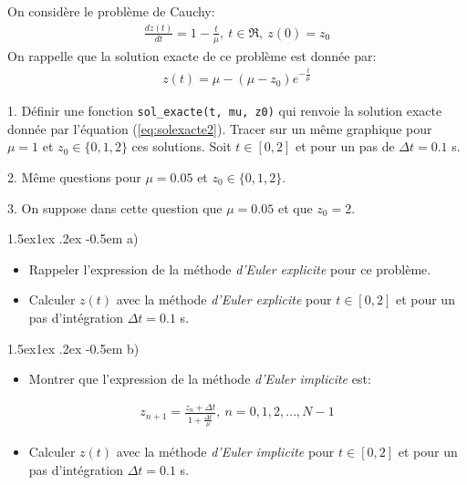 \documentclass[%
oneside,                 %
final,                   %
10pt,french]{article}
\makeatletter
\newenvironment{doconceexercise}{}{}
\newcounter{doconceexercisecounter}
\newcommand\subex{\@startsection{paragraph}{4}{\z@}%
                  {1.5ex\@plus1ex \@minus.2ex}%
                  {-0.5em}%
                  {\normalfont\normalsize\bfseries}}
\makeatother
\begin{document}
\begin{doconceexercise}



On considère le problème de Cauchy:
\begin{align}
\frac{d z(t)}{dt} = 1 - \frac{t}{\mu}, \ t \in \Re, \ z(0) = z_0
\end{align}
On rappelle que la solution exacte de ce problème est donnée par:
\begin{align}
\label{eq:solexacte2}
z(t) = \mu -(\mu - z_0) e^{-\frac{t}{\mu}}
\end{align}

1. Définir une fonction \Verb!sol_exacte(t, mu, z0)! qui renvoie la solution exacte donnée par l'équation (\ref{eq:solexacte2}). Tracer sur un même graphique pour $\mu= 1$ et $z_0 \in \{0, 1, 2\}$ ces solutions. Soit $t \in [0,2]$ et pour un pas de $\Delta t = 0.1$ s.

2. Même questions pour $\mu= 0.05$ et $z_0 \in \{0, 1, 2\}$.

3. On suppose dans cette question que $\mu= 0.05$ et que $z_0  = 2$.


\subex{a)}
\begin{itemize}
\item Rappeler l'expression de la méthode \emph{d'Euler explicite} pour ce problème.

\item Calculer $z(t)$ avec la méthode \emph{d’Euler explicite} pour $t \in [0, 2]$ et pour un pas d’intégration $\Delta t = 0.1$ s.
\end{itemize}

\noindent
\subex{b)}
\begin{itemize}
\item Montrer que l'expression de la méthode \emph{d'Euler implicite} est:
\end{itemize}

\noindent
\begin{align*}
z_{n+1} = \frac{z_n + \Delta t}{1 + \frac{\Delta t}{\mu}}, \ n = 0, 1, 2, ..., N-1
\end{align*}
\begin{itemize}
\item Calculer $z(t)$ avec la méthode \emph{d’Euler implicite} pour $t \in [0, 2]$ et pour un pas d’intégration $\Delta t = 0.1$ s.
\end{itemize}


\end{doconceexercise}
\end{document}
